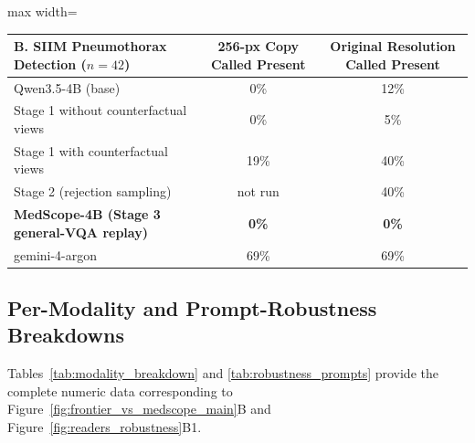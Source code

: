\documentclass{article} %
\begin{document}
\begin{table}[h]
\begin{center}
\vspace{0.2cm}
\begin{adjustbox}{max width=\linewidth}
\begin{tabular}{lcc}
\toprule
\textbf{B. SIIM Pneumothorax Detection ($n=42$)} & \textbf{256-px Copy Called Present} & \textbf{Original Resolution Called Present} \\
\midrule
Qwen3.5-4B (base) & 0\% & 12\% \\
Stage 1 without counterfactual views & 0\% & 5\% \\
Stage 1 with counterfactual views & 19\% & 40\% \\
Stage 2 (rejection sampling) & not run & 40\% \\
\textbf{MedScope-4B (Stage 3 general-VQA replay)} & \textbf{0\%} & \textbf{0\%} \\
gemini-4-argon & 69\% & 69\% \\
\bottomrule
\end{tabular}
\end{adjustbox}
\end{center}
\end{table}

\subsection{Per-Modality and Prompt-Robustness Breakdowns}
Tables~\ref{tab:modality_breakdown} and \ref{tab:robustness_prompts} provide the complete numeric data corresponding to Figure~\ref{fig:frontier_vs_medscope_main}B and Figure~\ref{fig:readers_robustness}B1.
\end{document}
